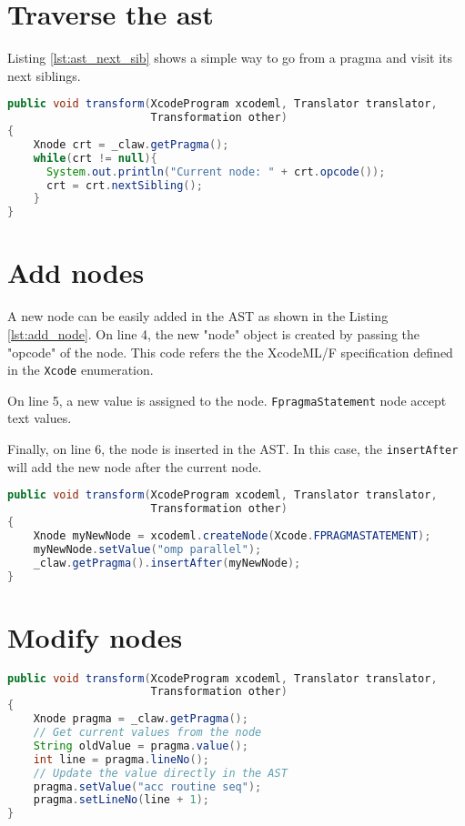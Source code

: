 \section{Traverse the \gls{ast}}
Listing \ref{lst:ast_next_sib} shows a simple way to go from a pragma and visit 
its next siblings.

\begin{lstlisting}[label=lst:ast_next_sib, language=Java, caption=XcodeML/F AST traverse]
public void transform(XcodeProgram xcodeml, Translator translator,
                      Transformation other)
{
    Xnode crt = _claw.getPragma();
    while(crt != null){
      System.out.println("Current node: " + crt.opcode());
      crt = crt.nextSibling();          
    }
}
\end{lstlisting}

\section{Add nodes}
A new node can be easily added in the AST as shown in the Listing 
\ref{lst:add_node}. On line 4, the new "node" object is created by
passing the "opcode" of the node. This code refers the the XcodeML/F 
specification defined in the \lstinline!Xcode! enumeration.

On line 5, a new value is assigned to the node. \lstinline!FpragmaStatement! 
node accept text values.

Finally, on line 6, the node is inserted in the AST. In this case, 
the \lstinline!insertAfter! will add the new node after the current node.

\begin{lstlisting}[label=lst:add_node, language=Java, caption=XcodeML/F add node example]
public void transform(XcodeProgram xcodeml, Translator translator,
                      Transformation other)
{
    Xnode myNewNode = xcodeml.createNode(Xcode.FPRAGMASTATEMENT);
    myNewNode.setValue("omp parallel");
    _claw.getPragma().insertAfter(myNewNode);
}
\end{lstlisting}

\section{Modify nodes}

\begin{lstlisting}[label=lst:update_node, language=Java, caption=XcodeML/F update node example]
public void transform(XcodeProgram xcodeml, Translator translator,
                      Transformation other)
{
    Xnode pragma = _claw.getPragma();
    // Get current values from the node
    String oldValue = pragma.value();
    int line = pragma.lineNo();
    // Update the value directly in the AST
    pragma.setValue("acc routine seq");
    pragma.setLineNo(line + 1);
}
\end{lstlisting}

